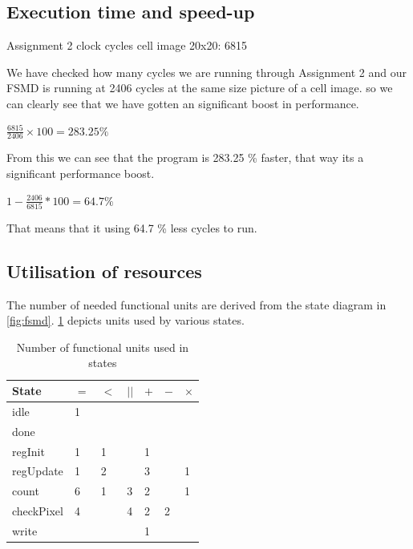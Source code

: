 \documentclass[a4paper, english]{article}
\numberwithin{equation}{section}
\begin{document}
\subsection{Execution time and speed-up}

Assignment 2 clock cycles cell image 20x20: 6815

We have checked how many cycles we are running through Assignment 2 and our FSMD is running at 2406 cycles at the same size picture of a cell image. so we can clearly see that we have gotten an significant boost in performance. 

$\frac{6815}{2406} \times 100 = 283.25 \%$

From this we can see that the program is 283.25 \% faster, that way its a significant performance boost. 

$1 - \frac{2406}{6815}* 100 = 64.7 \% $

That means that it using 64.7 \% less cycles to run.  


\subsection{Utilisation of resources}
The number of needed functional units are derived from the state diagram in \cref{fig:fsmd}. \cref{tbl:funcunits} depicts units used by various states.
\begin{table}[H]
    \centering
    \caption{Number of functional units used in states}\label{tbl:funcunits}
    \begin{tabular}{lllllll}
        \toprule
        State      & \(=\) & \(<\) & \(||\) & \(+\) & \(-\) & \(\times\) \\
        \midrule
        idle       & 1     &       &        &       &       &            \\
        done       &       &       &        &       &       &            \\
        regInit    & 1     & 1     &        & 1     &       &            \\
        regUpdate  & 1     & 2     &        & 3     &       & 1          \\
        count      & 6     & 1     & 3      & 2     &       & 1          \\
        checkPixel & 4     &       & 4      & 2     & 2     &            \\
        write      &       &       &        & 1     &       &            \\
        \bottomrule
    \end{tabular}
\end{table}
\end{document}
